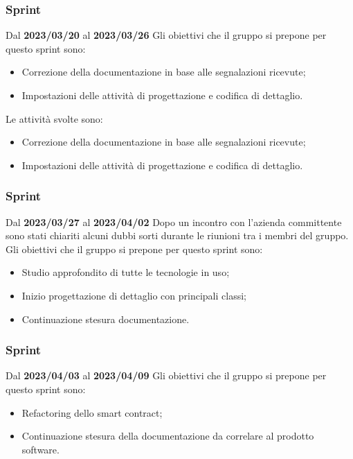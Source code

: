 \subsubsection{ Sprint}
Dal \textbf{2023/03/20} al \textbf{2023/03/26}
\newline
Gli obiettivi che il gruppo si prepone per questo sprint sono:
\begin{itemize}
    \item Correzione della documentazione in base alle segnalazioni ricevute;
    \item Impostazioni delle attività di progettazione e codifica di dettaglio.
\end{itemize}
Le attività svolte sono:
\begin{itemize}
    \item Correzione della documentazione in base alle segnalazioni ricevute;
    \item Impostazioni delle attività di progettazione e codifica di dettaglio.
\end{itemize}

\subsubsection{ Sprint}
Dal \textbf{2023/03/27} al \textbf{2023/04/02}
\newline
Dopo un incontro con l'azienda committente sono stati chiariti alcuni dubbi sorti durante le riunioni tra i membri del gruppo.
\newline
Gli obiettivi che il gruppo si prepone per questo sprint sono:
\begin{itemize}
    \item Studio approfondito di tutte le tecnologie in uso;
    \item Inizio progettazione di dettaglio con principali classi;
    \item Continuazione stesura documentazione.
\end{itemize}
\subsubsection{ Sprint}
Dal \textbf{2023/04/03} al \textbf{2023/04/09}
\newline
Gli obiettivi che il gruppo si prepone per questo sprint sono:
\begin{itemize}
    \item Refactoring dello smart contract;
    \item Continuazione stesura della documentazione da correlare al prodotto software.
\end{itemize}

